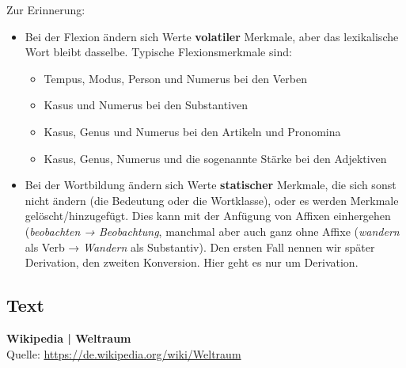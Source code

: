 Zur Erinnerung:

\begin{itemize}
  \item Bei der Flexion ändern sich Werte \textbf{volatiler} Merkmale, aber das lexikalische Wort bleibt dasselbe.
    Typische Flexionsmerkmale sind:
    \begin{itemize}\Lf
      \item Tempus, Modus, Person und Numerus bei den Verben
      \item Kasus und Numerus bei den Substantiven
      \item Kasus, Genus und Numerus bei den Artikeln und Pronomina
      \item Kasus, Genus, Numerus und die sogenannte Stärke bei den Adjektiven
    \end{itemize}
  \item Bei der Wortbildung ändern sich Werte \textbf{statischer} Merkmale, die sich sonst nicht ändern (\zB die Bedeutung oder die Wortklasse), oder es werden Merkmale gelöscht\slash hinzugefügt.
    Dies kann mit der Anfügung von Affixen einhergehen (\textit{beobachten → \textit{Beobachtung}}, manchmal aber auch ganz ohne Affixe (\textit{wandern} als Verb → \textit{Wandern} als Substantiv).
    Den ersten Fall nennen wir später Derivation, den zweiten Konversion.
    Hier geht es nur um Derivation.
\end{itemize}

\subsection{Text}

\textbf{Wikipedia | Weltraum}\\
\footnotesize Quelle: \url{https://de.wikipedia.org/wiki/Weltraum}\\

